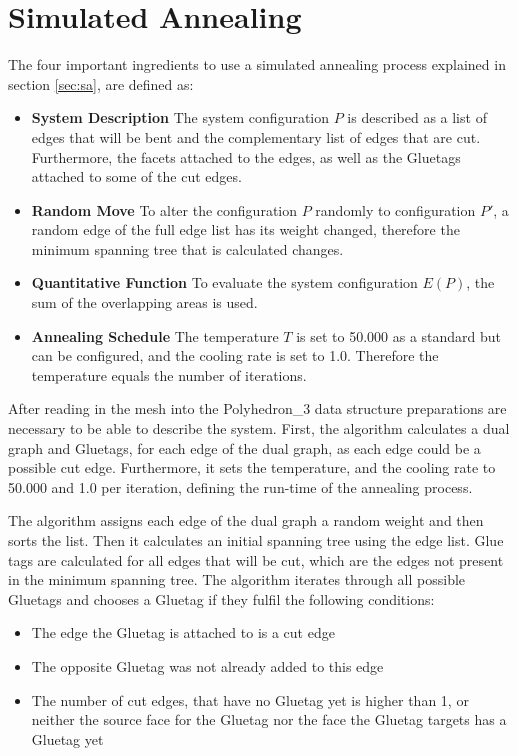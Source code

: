 \documentclass[draft,final]{vutinfth} %
\begin{document}
\section{Simulated Annealing}
\label{sec:annealing}
The four important ingredients to use a simulated annealing process explained in section \ref{sec:sa}, are defined as:
\begin{itemize}
    \item \textbf{System Description} The system configuration $P$ is described as a list of edges that will be bent and the complementary list of edges that are cut. Furthermore, the facets attached to the edges, as well as the Gluetags attached to some of the cut edges.
    \item \textbf{Random Move} To alter the configuration $P$ randomly to configuration $P'$, a random edge of the full edge list has its weight changed, therefore the minimum spanning tree that is calculated changes.
    \item \textbf{Quantitative Function} To evaluate the system configuration $E(P)$, the sum of the overlapping areas is used.
    \item \textbf{Annealing Schedule} The temperature $T$ is set to 50.000 as a standard but can be configured, and the cooling rate is set to 1.0. Therefore the temperature equals the number of iterations.
\end{itemize}

After reading in the mesh into the Polyhedron\_3 data structure preparations are necessary to be able to describe the system. First, the algorithm calculates a dual graph and Gluetags, for each edge of the dual graph, as each edge could be a possible cut edge. Furthermore, it sets the temperature, and the cooling rate to 50.000 and 1.0 per iteration, defining the run-time of the annealing process.

The algorithm assigns each edge of the dual graph a random weight and then sorts the list. Then it calculates an initial spanning tree using the edge list. Glue tags are calculated for all edges that will be cut, which are the edges not present in the minimum spanning tree. The algorithm iterates through all possible Gluetags and chooses a Gluetag if they fulfil the following conditions:

\begin{itemize}
    \item The edge the Gluetag is attached to is a cut edge
    \item The opposite Gluetag was not already added to this edge
    \item The number of cut edges, that have no Gluetag yet is higher than 1, or neither the source face for the Gluetag nor the face the Gluetag targets has a Gluetag yet
\end{itemize}
\end{document}
